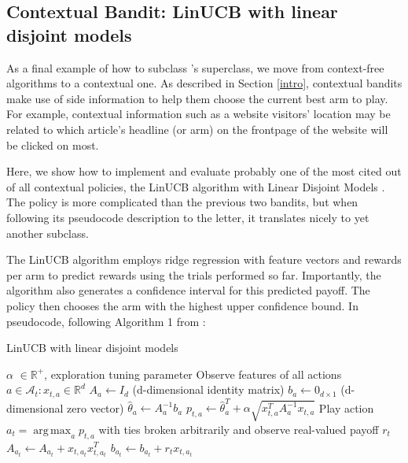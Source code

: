 \documentclass{jss}
\DeclareMathOperator*{\argmax}{arg\,max}
\begin{document}
\subsection{Contextual Bandit: LinUCB with linear disjoint models} \label{linucbc}

As a final example of how to subclass 's  superclass, we move from context-free algorithms to a contextual one. As described in Section \ref{intro}, contextual bandits make use of side information to help them choose the current best arm to play. For example, contextual information such as a website visitors' location may be related to which article's headline (or arm) on the frontpage of the website will be clicked on most.

Here, we show how to implement and evaluate probably one of the most cited out of all contextual policies, the LinUCB algorithm with Linear Disjoint Models \cite{Li2010}. The policy is more complicated than the previous two bandits, but when following its pseudocode description to the letter, it translates nicely to yet another  subclass.

The LinUCB algorithm employs ridge regression with feature vectors and rewards per arm to predict rewards using the trials performed so far. Importantly, the algorithm also generates a confidence interval for this predicted payoff. The policy then chooses the arm with the highest upper confidence bound. In pseudocode, following Algorithm 1 from \cite{Li2010}:

\begin{algorithm}[H]
\caption{LinUCB with linear disjoint models}
\label{Alg:LinUCBDisjoint}
\begin{algorithmic}
\REQUIRE $\alpha$ \(  \in \mathbb{R}^{+} \), exploration tuning parameter
          \STATE Observe features of all actions \(  a \in \mathcal{A}_{t}: x_{t,a} \in \mathbb{R}^{d}\)
		      \STATE \(A_{a} \leftarrow I_{d}  \)  (d-dimensional identity matrix)
		      \STATE \(b_{a} \leftarrow 0_{d\times1}   \) (d-dimensional zero vector)
		\ENDIF
		\STATE \( \hat{\theta}_{a} \leftarrow A_{a}^{-1}b_{a} \)
		\STATE \( p_{t,a} \leftarrow \hat{\theta}_{a}^{T} + \alpha  \sqrt{ x_{t,a}^{T} A_{a}^{-1}x_{t,a}} \)
	\ENDFOR
	\STATE Play action \(a_t = \argmax_a  p_{t,a}  \) with ties broken arbitrarily and observe real-valued payoff $r_t$
           \STATE \( A_{a_{t}} \leftarrow A_{a_{t}}+ x_{t,a_{t}}x_{t,a_{t}}^{T} \)
           \STATE  \( b_{a_{t}} \leftarrow b_{a_{t}}+ r_{t}x_{t,a_{t}}  \)
\ENDFOR
\end{algorithmic}
\end{algorithm}
\end{document}
